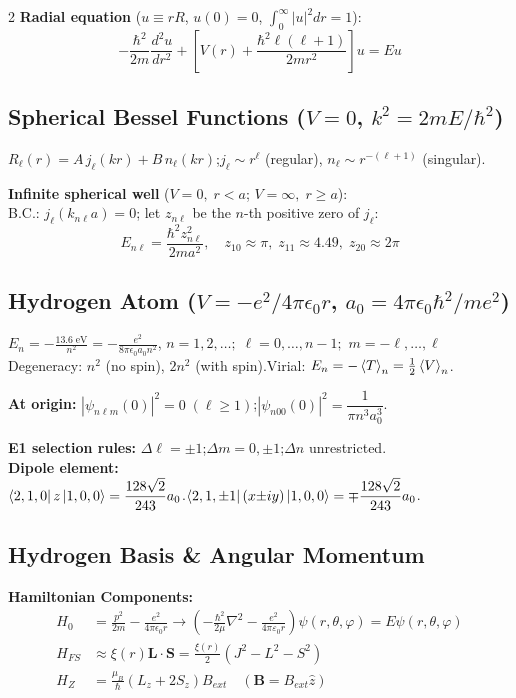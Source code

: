 \documentclass[9pt,a4paper]{article} %
\begin{document}
\begin{multicols}{2}
\textbf{Radial equation} ($u\equiv rR$, $u(0)=0$, $\int_0^\infty|u|^2dr=1$):
\[
-\frac{\hbar^2}{2m}\frac{d^2u}{dr^2}+\left[V(r)+\frac{\hbar^2\ell(\ell+1)}{2mr^2}\right]u=Eu
\]

\subsection{Spherical Bessel Functions ($V=0$, $k^2=2mE/\hbar^2$)}
$R_\ell(r)=A\,j_\ell(kr)+B\,n_\ell(kr)$;\quad $j_\ell\sim r^\ell$ (regular), $n_\ell\sim r^{-(\ell+1)}$ (singular).


\textbf{Infinite spherical well} ($V=0,\;r<a$; $V=\infty,\;r\ge a$):\\
B.C.: $j_\ell(k_{n\ell}a)=0$;\; let $z_{n\ell}$ be the $n$-th positive zero of $j_\ell$:
\[
E_{n\ell}=\frac{\hbar^2 z_{n\ell}^2}{2ma^2},\quad z_{10}\approx\pi,\;z_{11}\approx 4.49,\;z_{20}\approx 2\pi
\]

\subsection{Hydrogen Atom ($V=-e^2/4\pi\epsilon_0 r$,\; $a_0=4\pi\epsilon_0\hbar^2/me^2$)}
$\displaystyle
\boxed{E_n=-\frac{13.6\;\text{eV}}{n^2}=-\frac{e^2}{8\pi\epsilon_0 a_0 n^2}}$, $n=1,2,\ldots;\;\ell=0,\ldots,n{-}1;$
$m=-\ell,\ldots,\ell$\\
Degeneracy: $n^2$ (no spin), $2n^2$ (with spin).\quad Virial: $E_n = -\ev{T}_n = \tfrac{1}{2}\ev{V}_n$.

\textbf{At origin:} $|\psi_{n\ell m}(0)|^2=0\;(\ell\ge1)$;\quad $|\psi_{n00}(0)|^2=\dfrac{1}{\pi n^3 a_0^3}$.

\textbf{E1 selection rules:} $\Delta\ell=\pm1$;\;$\Delta m=0,\pm1$;\;$\Delta n$ unrestricted.\\
\textbf{Dipole element:} \\
$\bra{2,1,0}z\ket{1,0,0}=\dfrac{128\sqrt{2}}{243}a_0$.\quad $\bra{2,1,\pm1}(x{\pm}iy)\ket{1,0,0}=\mp\dfrac{128\sqrt{2}}{243}a_0$.

\subsection{Hydrogen Basis \& Angular Momentum}

\textbf{Hamiltonian Components:}
\begin{align*}
    H_0 &= \frac{p^2}{2m} - \frac{e^2}{4\pi\epsilon_0 r}\rightarrow{\displaystyle \left(-{\frac {\hbar ^{2}}{2\mu }}\nabla ^{2}-{\frac {e^{2}}{4\pi \varepsilon _{0}r}}\right)\psi (r,\theta ,\varphi )=E\psi (r,\theta ,\varphi )}\\
    H_{FS} &\approx \xi(r) \mathbf{L} \cdot \mathbf{S} = \frac{\xi(r)}{2}(J^2 - L^2 - S^2) \\
    H_Z &= \frac{\mu_B}{\hbar}(L_z + 2S_z)B_{ext} \quad (\mathbf{B} = B_{ext}\hat{z})
\end{align*}


\end{multicols}
\end{document}
